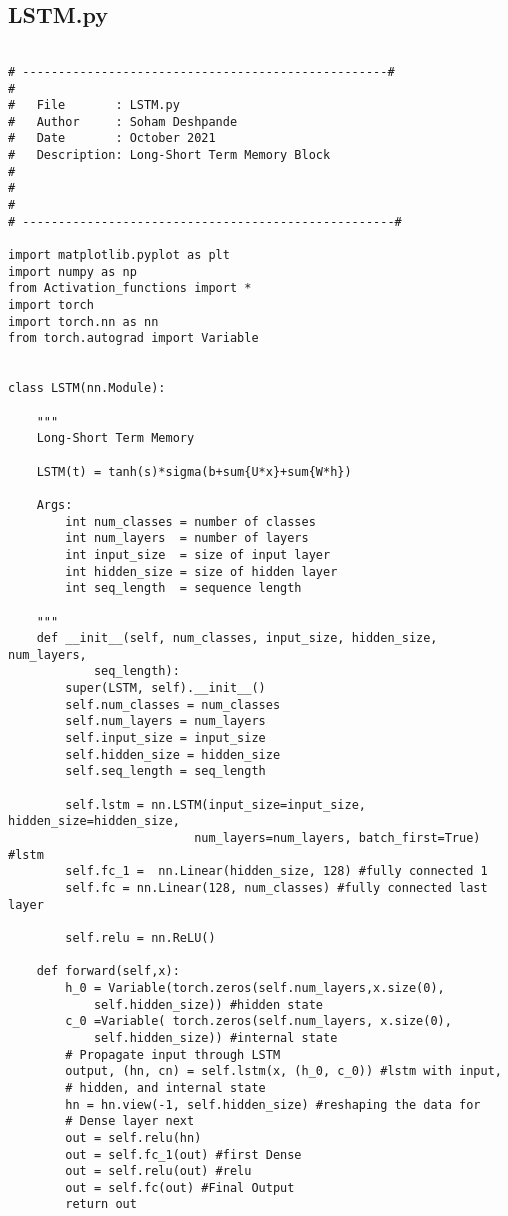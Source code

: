 \documentclass{article}
\begin{document}
\subsection{LSTM.py}
\begin{lstlisting}

# ---------------------------------------------------#
#
#   File       : LSTM.py
#   Author     : Soham Deshpande
#   Date       : October 2021
#   Description: Long-Short Term Memory Block
#
#
#
# ----------------------------------------------------#

import matplotlib.pyplot as plt
import numpy as np
from Activation_functions import *
import torch
import torch.nn as nn
from torch.autograd import Variable


class LSTM(nn.Module):

    """
    Long-Short Term Memory

    LSTM(t) = tanh(s)*sigma(b+sum{U*x}+sum{W*h})

    Args:
        int num_classes = number of classes
        int num_layers  = number of layers
        int input_size  = size of input layer
        int hidden_size = size of hidden layer
        int seq_length  = sequence length

    """
    def __init__(self, num_classes, input_size, hidden_size, num_layers,
            seq_length):
        super(LSTM, self).__init__()
        self.num_classes = num_classes
        self.num_layers = num_layers
        self.input_size = input_size
        self.hidden_size = hidden_size
        self.seq_length = seq_length

        self.lstm = nn.LSTM(input_size=input_size, hidden_size=hidden_size,
                          num_layers=num_layers, batch_first=True) #lstm
        self.fc_1 =  nn.Linear(hidden_size, 128) #fully connected 1
        self.fc = nn.Linear(128, num_classes) #fully connected last layer

        self.relu = nn.ReLU()

    def forward(self,x):
        h_0 = Variable(torch.zeros(self.num_layers,x.size(0),
            self.hidden_size)) #hidden state
        c_0 =Variable( torch.zeros(self.num_layers, x.size(0),
            self.hidden_size)) #internal state
        # Propagate input through LSTM
        output, (hn, cn) = self.lstm(x, (h_0, c_0)) #lstm with input,
        # hidden, and internal state
        hn = hn.view(-1, self.hidden_size) #reshaping the data for
        # Dense layer next
        out = self.relu(hn)
        out = self.fc_1(out) #first Dense
        out = self.relu(out) #relu
        out = self.fc(out) #Final Output
        return out











\end{lstlisting}
\end{document}
